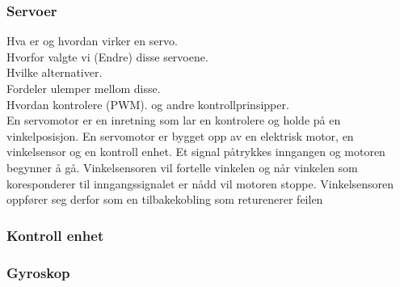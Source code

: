 \documentclass[a4paper, 11pt]{article}
\begin{document}
\subsubsection{Servoer}
Hva er og hvordan virker en servo. \\
Hvorfor valgte vi (Endre) disse servoene. \\
Hvilke alternativer. \\
Fordeler ulemper mellom disse. \\
Hvordan kontrolere (PWM). og andre kontrollprinsipper. \\

En servomotor er en inretning som lar en kontrolere og holde på en vinkelposisjon. En servomotor er bygget opp av en elektrisk motor, en vinkelsensor og en kontroll enhet. Et signal påtrykkes inngangen og motoren begynner å gå. Vinkelsensoren vil fortelle vinkelen og når vinkelen som koresponderer til inngangssignalet er nådd vil motoren stoppe. Vinkelsensoren oppfører seg derfor som en tilbakekobling som returenerer feilen    

\subsubsection{Kontroll enhet}
\subsubsection{Gyroskop}
\end{document}
